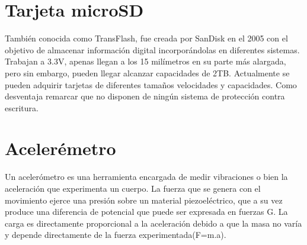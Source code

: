 \section{Tarjeta microSD}
También conocida como TransFlash,\cite{tarjeta} fue creada por SanDisk en el 2005 con el objetivo de almacenar información digital incorporándolas en diferentes sistemas. Trabajan a 3.3V, apenas llegan a los 15 milímetros en su parte más alargada, pero sin embargo, pueden llegar alcanzar capacidades de 2TB. Actualmente se pueden adquirir tarjetas de diferentes tamaños velocidades y capacidades. Como desventaja remarcar que no disponen de ningún sistema de protección contra escritura.

\section{Acelerémetro}
Un acelerómetro\cite{acelerometro} es una herramienta encargada de medir vibraciones o bien la aceleración que experimenta un cuerpo. La fuerza que se genera con el movimiento ejerce una presión sobre un material piezoeléctrico, que a su vez produce una diferencia de potencial que puede ser expresada en fuerzas G. La carga es directamente proporcional a la aceleración debido a que la masa no varía y depende directamente de la fuerza experimentada(F=m.a).
